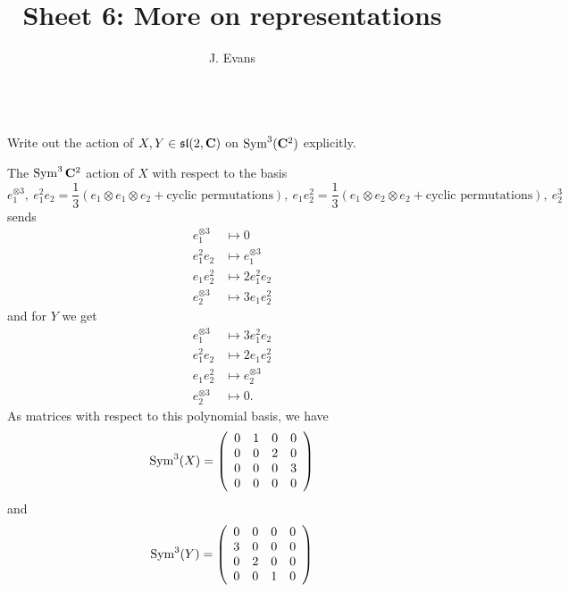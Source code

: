 \documentclass[12pt]{article}
\title{Sheet 6: More on representations}
\author{J. Evans}
\date{}
\begin{document}
\maketitle

\begin{question}\ \\
Write out the action of $X,Y\in\mathfrak{sl}(2,\mathbf{C})$ on $\operatorname{Sym}^3(\mathbf{C}^2)$ explicitly.
\end{question}

\begin{answer}
The $\operatorname{Sym}^3\mathbf{C}^2$ action of $X$ with respect to the basis
\[e_1^{\otimes 3},\ e_1^2e_2=\frac{1}{3}(e_1\otimes e_1\otimes e_2+\mbox{cyclic permutations}),\ e_1e_2^2=\frac{1}{3}(e_1\otimes e_2\otimes e_2+\mbox{cyclic permutations}),\ e_2^3\]
sends
\begin{align*}
e_1^{\otimes 3}&\mapsto 0\\
e_1^2e_2&\mapsto e_1^{\otimes 3}\\
e_1e_2^2&\mapsto 2e_1^2e_2\\
e_2^{\otimes 3}&\mapsto 3e_1e_2^2
\end{align*}
and for $Y$ we get
\begin{align*}
e_1^{\otimes 3}&\mapsto 3e_1^2e_2\\
e_1^2e_2&\mapsto 2e_1e_2^2\\
e_1e_2^2&\mapsto e_2^{\otimes 3}\\
e_2^{\otimes 3}&\mapsto 0.
\end{align*}
As matrices with respect to this polynomial basis, we have
\[\operatorname{Sym}^3(X)=\left(\begin{array}{cccc}0&1&0&0\\ 0&0&2&0\\ 0&0&0&3\\ 0&0&0&0\end{array}\right)\]
and
\[\operatorname{Sym}^3(Y)=\left(\begin{array}{cccc}0&0&0&0\\ 3&0&0&0\\ 0&2&0&0\\ 0&0&1&0\end{array}\right)\]
\end{answer}
\newpage

\bigskip
\end{document}
